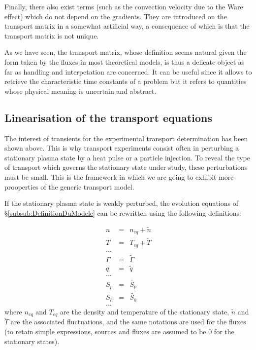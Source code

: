 Finally, there also exist terms (such as the convection velocity due to the Ware effect) which do not depend on the gradients. They are introduced on the transport matrix in a somewhat artificial way, a consequence of which is that the transport matrix is not unique.

As we have seen, the transport matrix, whose definition seems natural given the form taken by the fluxes in most theoretical models, is thus a delicate object as far as handling and interpetation are concerned. It can be useful since it allows to retrieve the characteristic time constants of a problem but it refers to quantities whose physical meaning is uncertain and abstract. 

				\subsection{Linearisation of the transport equations}
				\label{sub:LinearisationDesEquationsDeTransport}

The interest of transients for the experimental transport determination has been shown above. This is why transport experiments consist often in perturbing a stationary plasma state by a heat pulse or a particle injection. To reveal the type of transport which governs the stationary state under study, these perturbations must be small. This is the framework in which we are going to exhibit more prooperties of the generic transport model.
	
If the stationary plasma state is weakly perturbed, the evolution equations of §\ref{subsub:DefinitionDuModele} can be rewritten using the following definitions:

\begin{eqnarray}
	n 			&	=	& n_{eq} + \tilde{n}	\nonumber	\\
	T 			&	=	& T_{eq} + \tilde{T}	\nonumber	\\
	\ldots	&		&											\nonumber	\\
	\Gamma	&	=	& \tilde{\Gamma}			\nonumber	\\	
	q 			&	=	& \tilde{q}						\nonumber	\\
	\ldots	&		&											\nonumber	\\
	S_p 		&	=	& \tilde{S_p}					\nonumber	\\
	S_h 		&	= &	\tilde{S_h}					\nonumber	\\
	\ldots	&		&											\nonumber
\end{eqnarray}
where $n_{eq}$ and $T_{eq}$ are the density and temperature of the stationary state, $\tilde{n}$ and $\tilde{T}$ are the associated fluctuations, and the same notations are used for the fluxes (to retain simple expressions, sources and fluxes are assumed to be 0 for the stationary states).


